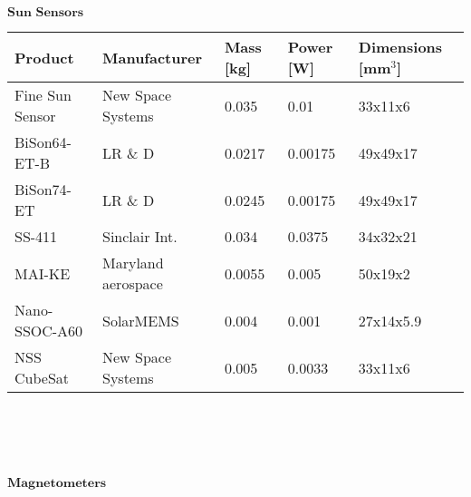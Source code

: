  $\textbf{Sun Sensors}$\\

 
 \begin{tabular}{p{3cm}p{3cm}p{2cm}p{2cm}p{2cm}} \toprule
 	Product & Manufacturer & Mass [kg] & Power [W]& Dimensions [mm$^{3}$]\\ \midrule
 	
 		Fine Sun Sensor & New Space Systems & 0.035 & 0.01 & 33x11x6 \\
 		
 		BiSon64-ET-B & LR \& D & 0.0217 & 0.00175 & 49x49x17 \\
 		
 		BiSon74-ET & LR \& D  & 0.0245 & 0.00175 & 49x49x17  \\
 		
 		SS-411 & Sinclair Int. & 0.034 & 0.0375 & 34x32x21 \\
 	
 		MAI-KE & Maryland aerospace & 0.0055 & 0.005 & 50x19x2 \\
 		
 		Nano-SSOC-A60 & SolarMEMS & 0.004 & 0.001 & 27x14x5.9 \\
 		
 		NSS CubeSat & New Space Systems & 0.005 & 0.0033 & 33x11x6  \\ \bottomrule
 		
 \end{tabular}\\ \\ \\ \\
       
       
      
  $\textbf{Magnetometers}$\\
     
      
      
